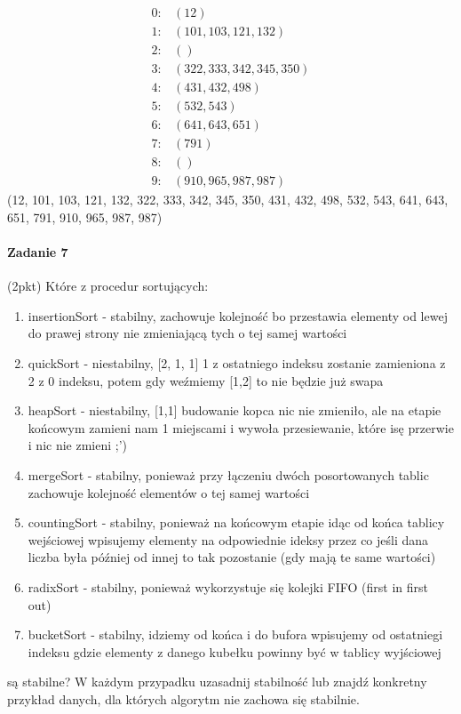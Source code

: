 \documentclass[18pt]{extarticle}
\begin{document}
\begin{align*}
    0: & \left(12\right) \\
    1: & \left(101, 103, 121, 132\right) \\
    2: & \left(\right) \\
    3: & \left(322, 333, 342, 345, 350\right) \\
    4: & \left(431, 432, 498\right) \\
    5: & \left(532, 543\right) \\
    6: & \left(641, 643, 651\right) \\
    7: & \left(791\right) \\
    8: & \left(\right) \\
    9: & \left(910, 965, 987, 987\right)
\end{align*}
(12, 101, 103, 121, 132, 322, 333, 342, 345, 350, 431, 432, 498, 532, 543, 641, 643, 651, 791, 910, 965, 987, 987)

\paragraph{Zadanie 7} (2pkt) Które z procedur sortujących:
\begin{enumerate}
    \item insertionSort - stabilny, zachowuje kolejność bo przestawia elementy od lewej do prawej strony nie zmieniającą tych o tej samej wartości
    \item quickSort - niestabilny, [2, 1, 1] 1 z ostatniego indeksu zostanie zamieniona z 2 z 0 indeksu, potem gdy weźmiemy [1,2] to nie będzie już swapa 
    \item heapSort - niestabilny, [1,1] budowanie kopca nic nie zmieniło, ale na etapie końcowym zamieni nam 1 miejscami i wywoła przesiewanie, które isę przerwie i nic nie zmieni ;')
    \item mergeSort - stabilny, ponieważ przy łączeniu dwóch posortowanych tablic zachowuje kolejność elementów o tej samej wartości
    \item countingSort - stabilny, ponieważ na końcowym etapie idąc od końca tablicy wejściowej wpisujemy elementy na odpowiednie ideksy przez co jeśli dana liczba była później od innej to tak pozostanie (gdy mają te same wartości)
    \item radixSort - stabilny, ponieważ wykorzystuje się kolejki FIFO (first in first out)
    \item bucketSort - stabilny, idziemy od końca i do bufora wpisujemy od ostatniegi indeksu gdzie elementy z danego kubełku powinny być w tablicy wyjściowej
\end{enumerate}
są stabilne? W każdym przypadku uzasadnij stabilność lub znajdź konkretny przykład danych, dla których algorytm nie zachowa się stabilnie.
\end{document}
